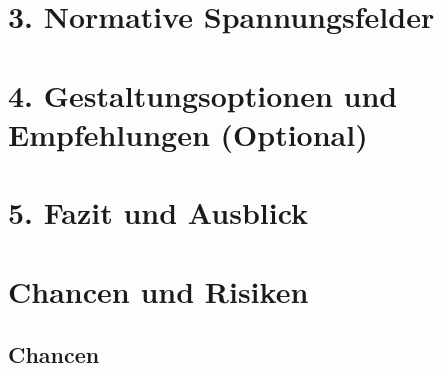 \section{3. Normative Spannungsfelder }

\section{4. Gestaltungsoptionen und Empfehlungen (Optional)}

\section{5. Fazit und Ausblick}





















\section{Chancen und Risiken}

\subsection{Chancen}

